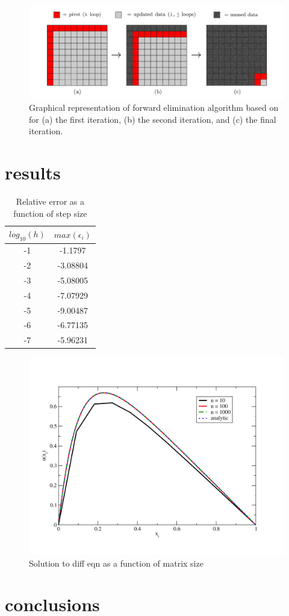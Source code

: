 \documentclass[prc,amsmath,twocolumn,superscriptaddress]{revtex4}
\begin{document}
\begin{figure}[t]
\includegraphics[scale=0.2]{algorithm.jpg}
\caption{Graphical representation of forward elimination algorithm based on~\cite{graph} for (a) the first iteration, (b) the second iteration, and (c) the final iteration.}
\label{algorithm}
\end{figure}

\section{results}
\begin{table}[h]
\centering
\begin{tabular}{|c|c|}
\hline
$log_{10}(h)$ & $max(\epsilon_i)$\\
\hline
-1&-1.1797\\
-2&-3.08804\\
-3&-5.08005\\
-4&-7.07929\\
-5&-9.00487\\
-6&-6.77135\\
-7&-5.96231\\
\hline
\end{tabular}
\caption{Relative error as a function of step size}
\label{mpi_table}
\end{table}

\begin{figure}[t]
\includegraphics[scale=0.35]{output}
\caption{Solution to diff eqn as a function of matrix size}
\label{output}
\end{figure}

\section{conclusions}

%
\end{document}
